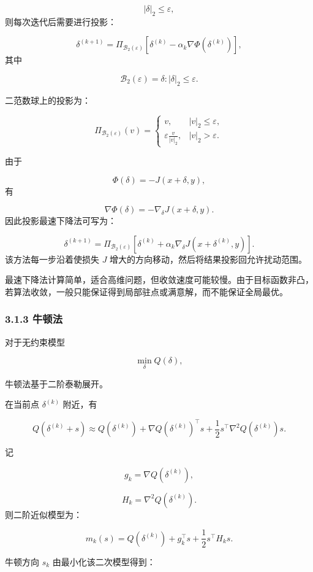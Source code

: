 ﻿\documentclass[UTF8,zihao=-4,fontset=none]{ctexart}
\begin{document}
\[
|\delta|_2\le\varepsilon,
\]
\noindent 则每次迭代后需要进行投影：

\[
\delta^{(k+1)}
=
\Pi_{\mathcal{B}_2(\varepsilon)}
\left[
\delta^{(k)}
-
\alpha_k\nabla \Phi(\delta^{(k)})
\right],
\]
\noindent 其中

\[
\mathcal{B}_2(\varepsilon)
=
{\delta:|\delta|_2\le\varepsilon}.
\]

二范数球上的投影为：

\[
\Pi_{\mathcal{B}_2(\varepsilon)}(v)
=
\begin{cases}
v, & |v|_2\le\varepsilon,\\[4pt]
\varepsilon\frac{v}{|v|_2}, & |v|_2>\varepsilon.
\end{cases}
\]

由于

\[
\Phi(\delta)=-J(x+\delta,y),
\]
\noindent 有

\[
\nabla\Phi(\delta)
=
-\nabla_\delta J(x+\delta,y).
\]
\noindent 因此投影最速下降法可写为：

\[
\delta^{(k+1)}
=
\Pi_{\mathcal{B}_2(\varepsilon)}
\left[
\delta^{(k)}
+
\alpha_k\nabla_\delta J(x+\delta^{(k)},y)
\right].
\]
\noindent 该方法每一步沿着使损失 \(J\) 增大的方向移动，然后将结果投影回允许扰动范围。

最速下降法计算简单，适合高维问题，但收敛速度可能较慢。由于目标函数非凸，若算法收敛，一般只能保证得到局部驻点或满意解，而不能保证全局最优。

\subsubsection*{3.1.3 牛顿法}
{}

对于无约束模型

\[
\min_\delta Q(\delta),
\]

牛顿法基于二阶泰勒展开。

在当前点 \(\delta^{(k)}\) 附近，有

\[
Q(\delta^{(k)}+s)
\approx
Q(\delta^{(k)})
+
\nabla Q(\delta^{(k)})^\top s
+
\frac12 s^\top \nabla^2Q(\delta^{(k)})s.
\]

记

\[
g_k=\nabla Q(\delta^{(k)}),
\]

\[
H_k=\nabla^2Q(\delta^{(k)}).
\]
\noindent 则二阶近似模型为：

\[
m_k(s)
=
Q(\delta^{(k)})
+
g_k^\top s
+
\frac12s^\top H_ks.
\]

牛顿方向 \(s_k\) 由最小化该二次模型得到：
\end{document}

